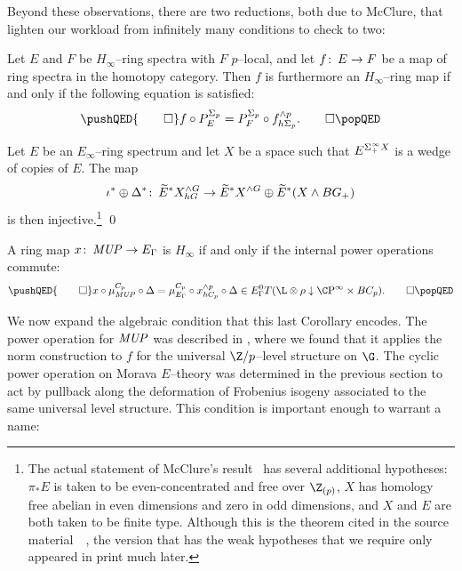 Beyond these observations, there are two reductions, both due to McClure, that lighten our workload from infinitely many conditions to check to two:

\begin{theorem}
Let \(E\) and \(F\) be \(H_\infty\)--ring spectra with \(F\) \(p\)--local, and let \(f\colon\thinspace E \to F\) be a map of ring spectra in the homotopy category.  Then \(f\) is furthermore an \(H_\infty\)--ring map if and only if the following equation is satisfied:
\[
\pushQED{\qed}
f \circ P^{\Sigma_p}_E = P^{\Sigma_p}_F \circ f^{\sm p}_{h\Sigma_p}. \qedhere
\popQED
\]
\end{theorem}

\begin{theorem}
Let \(E\) be an \(E_\infty\)--ring spectrum and let \(X\) be a space such that \(E^{\Sigma^\infty_+ X}\) is a wedge of copies of \(E\).  The map \[\iota^* \oplus \Delta^*\colon\thinspace \widetilde E^* X^{\wedge G}_{hG} \to \widetilde E^* X^{\wedge G} \oplus \widetilde E^*(X \wedge BG_+)\] is then injective.\footnote{The actual statement of McClure's result~\cite[Proposition VIII.7.3]{BMMS} has several additional hypotheses: \(\pi_* E\) is taken to be even-concentrated and free over \(\Z_{(p)}\), \(X\) has homology free abelian in even dimensions and zero in odd dimensions, and \(X\) and \(E\) are both taken to be finite type.  Although this is the theorem cited in the source material~\cite[Section 4]{Ando}~\cite[Proof of Proposition 6.1]{AHSHinfty}, the version that has the weak hypotheses that we require only appeared in print much later.} \qed
\end{theorem}

\begin{corollary}
A ring map \(x\colon\thinspace \mathit{MUP} \to E_\Gamma\) is \(H_\infty\) if and only if the internal power operations commute: \[
\pushQED{\qed}
x \circ \mu^{C_p}_{\MUP} \circ \Delta = \mu^{C_p}_{E_\Gamma} \circ x^{\sm p}_{hC_p} \circ \Delta \in E_\Gamma^0 T(\L \otimes \rho \downarrow \CP^\infty \times BC_p).
\qedhere
\popQED
\]
\end{corollary}

We now expand the algebraic condition that this last Corollary encodes.  The power operation for \(\mathit{MUP}\) was described in , where we found that it applies the norm construction to \(f\) for the universal \(\Z/p\)--level structure on \(\G\).  The cyclic power operation on Morava \(E\)--theory was determined in the previous section to act by pullback along the deformation of Frobenius isogeny associated to the same universal level structure.  This condition is important enough to warrant a name:

